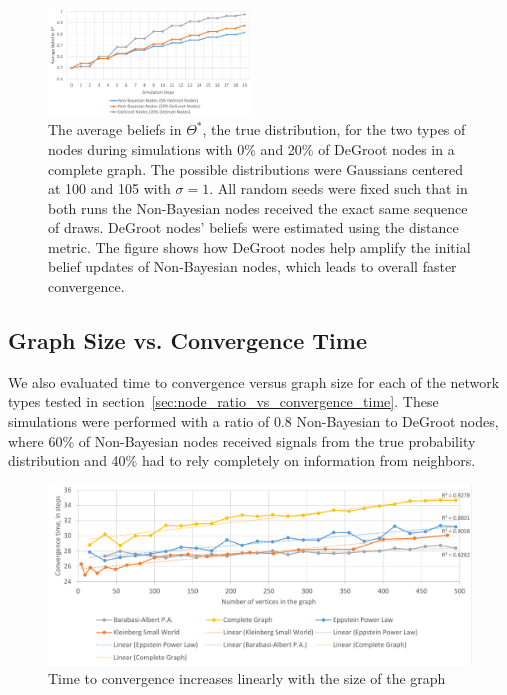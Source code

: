 \documentclass[letterpaper, 11pt, conference]{ieeeconf}
\begin{document}
\begin{figure}[th]
\centering
\includegraphics[width=0.48\textwidth]{figures/dg_faster}
\caption{The average beliefs in $\Theta^*$, the true distribution, for the two types of nodes during simulations with 0\% and 20\% of DeGroot nodes in a complete graph. The possible distributions were Gaussians centered at 100 and 105 with $\sigma=1$. All random seeds were fixed such that in both runs the Non-Bayesian nodes received the exact same sequence of draws. DeGroot nodes' beliefs were estimated using the distance metric. The figure shows how DeGroot nodes help amplify the initial belief updates of Non-Bayesian nodes, which leads to overall faster convergence.}
\label{fig:dg_faster}
\end{figure}


\subsection{Graph Size vs. Convergence Time}

We also evaluated time to convergence versus graph size for each of the network types tested in section~\ref{sec:node_ratio_vs_convergence_time}.  These simulations were performed with a ratio of 0.8 Non-Bayesian to DeGroot nodes, where 60\% of Non-Bayesian nodes received signals from the true probability distribution and 40\% had to rely completely on information from neighbors.

\begin{figure}[h]
\centering
\includegraphics[width=.9\textwidth]{figures/convergence_time}
\caption{Time to convergence increases linearly with the size of the graph}
\label{fig:convergence_time}
\end{figure}
\end{document}
